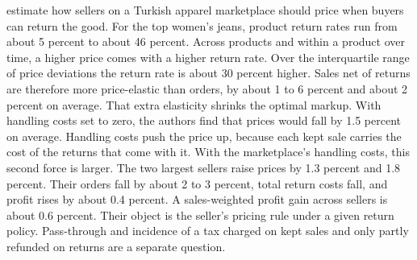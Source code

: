 \documentclass[11pt]{article}
\begin{document}
\citet{cakmak_optimal_2022} estimate how sellers on a Turkish apparel
marketplace should price when buyers can return the good. For the top women's
jeans, product return rates run from about 5 percent to about 46 percent.
Across products and within a product over time, a higher price comes with a
higher return rate. Over the interquartile range of price deviations the return
rate is about 30 percent higher. Sales net of returns are therefore more
price-elastic than orders, by about 1 to 6 percent and about 2 percent on
average. That extra elasticity shrinks the optimal markup. With handling costs
set to zero, the authors find that prices would fall by 1.5 percent on average.
Handling costs push the price up, because each kept sale carries the cost of
the returns that come with it. With the marketplace's handling costs, this
second force is larger. The two largest sellers raise prices by 1.3 percent and
1.8 percent. Their orders fall by about 2 to 3 percent, total return costs
fall, and profit rises by about 0.4 percent. A sales-weighted profit gain
across sellers is about 0.6 percent. Their object is the seller's pricing rule
under a given return policy. Pass-through and incidence of a tax charged on
kept sales and only partly refunded on returns are a separate question.



\end{document}
